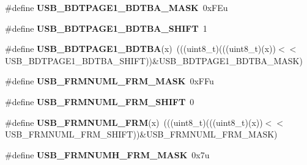 \begin{DoxyCompactItemize}
\item 
\#define {\bfseries U\+S\+B\+\_\+\+B\+D\+T\+P\+A\+G\+E1\+\_\+\+B\+D\+T\+B\+A\+\_\+\+M\+A\+SK}~0x\+F\+Eu\hypertarget{group__USB__Register__Masks_gacd2b27fefcff6f79e930e76d2a1a7b26}{}\label{group__USB__Register__Masks_gacd2b27fefcff6f79e930e76d2a1a7b26}

\item 
\#define {\bfseries U\+S\+B\+\_\+\+B\+D\+T\+P\+A\+G\+E1\+\_\+\+B\+D\+T\+B\+A\+\_\+\+S\+H\+I\+FT}~1\hypertarget{group__USB__Register__Masks_ga50c84ff08884c9825cf6c513f11aabe4}{}\label{group__USB__Register__Masks_ga50c84ff08884c9825cf6c513f11aabe4}

\item 
\#define {\bfseries U\+S\+B\+\_\+\+B\+D\+T\+P\+A\+G\+E1\+\_\+\+B\+D\+T\+BA}(x)~(((uint8\+\_\+t)(((uint8\+\_\+t)(x))$<$$<$U\+S\+B\+\_\+\+B\+D\+T\+P\+A\+G\+E1\+\_\+\+B\+D\+T\+B\+A\+\_\+\+S\+H\+I\+FT))\&U\+S\+B\+\_\+\+B\+D\+T\+P\+A\+G\+E1\+\_\+\+B\+D\+T\+B\+A\+\_\+\+M\+A\+SK)\hypertarget{group__USB__Register__Masks_gaab031dcfd0867133f1d23dd92ef695ad}{}\label{group__USB__Register__Masks_gaab031dcfd0867133f1d23dd92ef695ad}

\item 
\#define {\bfseries U\+S\+B\+\_\+\+F\+R\+M\+N\+U\+M\+L\+\_\+\+F\+R\+M\+\_\+\+M\+A\+SK}~0x\+F\+Fu\hypertarget{group__USB__Register__Masks_ga197f6ef10431b69cb9b84fe7241a318a}{}\label{group__USB__Register__Masks_ga197f6ef10431b69cb9b84fe7241a318a}

\item 
\#define {\bfseries U\+S\+B\+\_\+\+F\+R\+M\+N\+U\+M\+L\+\_\+\+F\+R\+M\+\_\+\+S\+H\+I\+FT}~0\hypertarget{group__USB__Register__Masks_ga723c2de82420db0c349049ad6f66ad14}{}\label{group__USB__Register__Masks_ga723c2de82420db0c349049ad6f66ad14}

\item 
\#define {\bfseries U\+S\+B\+\_\+\+F\+R\+M\+N\+U\+M\+L\+\_\+\+F\+RM}(x)~(((uint8\+\_\+t)(((uint8\+\_\+t)(x))$<$$<$U\+S\+B\+\_\+\+F\+R\+M\+N\+U\+M\+L\+\_\+\+F\+R\+M\+\_\+\+S\+H\+I\+FT))\&U\+S\+B\+\_\+\+F\+R\+M\+N\+U\+M\+L\+\_\+\+F\+R\+M\+\_\+\+M\+A\+SK)\hypertarget{group__USB__Register__Masks_gadd68274e4e3aa3763c3a5c36737188ff}{}\label{group__USB__Register__Masks_gadd68274e4e3aa3763c3a5c36737188ff}

\item 
\#define {\bfseries U\+S\+B\+\_\+\+F\+R\+M\+N\+U\+M\+H\+\_\+\+F\+R\+M\+\_\+\+M\+A\+SK}~0x7u\hypertarget{group__USB__Register__Masks_ga436241a677d27ecae3001b228b51f536}{}\label{group__USB__Register__Masks_ga436241a677d27ecae3001b228b51f536}


\end{DoxyCompactItemize}
